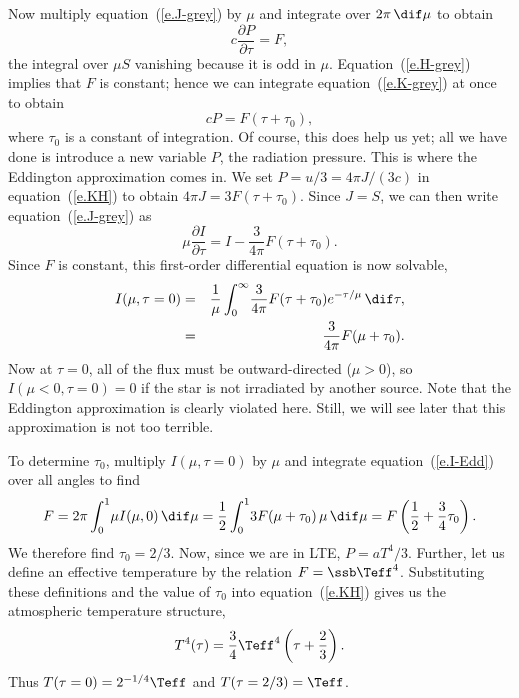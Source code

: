 Now multiply equation~(\ref{e.J-grey}) by $\mu$ and integrate over $2\pi\,\dif\mu$ to obtain
\begin{equation}\label{e.K-grey}
c\frac{\partial P}{\partial\tau} = F,
\end{equation}
the integral over $\mu S$ vanishing because it is odd in $\mu$. Equation~(\ref{e.H-grey}) implies that $F$ is constant; hence we can integrate equation~(\ref{e.K-grey}) at once to obtain
\begin{equation}\label{e.KH}
cP = F(\tau + \tau_{0}),
\end{equation}
where $\tau_{0}$ is a constant of integration. Of course, this does help us yet; all we have done is introduce a new variable $P$, the radiation pressure. This is where the Eddington approximation comes in.  We set $P = u/3 = 4\pi J/(3c)$ in equation~(\ref{e.KH}) to obtain $4\pi J = 3F(\tau + \tau_{0})$. Since $J = S$, we can then write equation~(\ref{e.J-grey}) as
\begin{equation}
\mu\frac{\partial I}{\partial\tau} = I - \frac{3}{4\pi}F(\tau+\tau_{0}).
\end{equation}
Since $F$ is constant, this first-order differential equation is now solvable,
\begin{eqnarray}
I(\mu,\tau=0) &=& \frac{1}{\mu}\int_{0}^{\infty}\!\frac{3}{4\pi}F(\tau + \tau_{0}) e^{-\tau/\mu}\,\dif\tau,\nonumber\\
  &=& \frac{3}{4\pi}F(\mu + \tau_{0}).\label{e.I-Edd}
\end{eqnarray}
Now at $\tau = 0$, all of the flux must be outward-directed ($\mu >0$), so $I(\mu < 0,\tau = 0) = 0$ if the star is not irradiated by another source.  Note that the Eddington approximation is clearly violated here.  Still, we will see later that this approximation is not too terrible. 

To determine $\tau_{0}$, multiply $I(\mu,\tau = 0)$ by $\mu$ and integrate equation~(\ref{e.I-Edd}) over all angles to find
\begin{equation}
F = 2\pi\int_{0}^{1}\!\mu I(\mu,0)\,\dif\mu = \frac{1}{2}\int_{0}^{1}\!3F(\mu + \tau_{0})\,\mu\,\dif\mu = F\left(\frac{1}{2} + \frac{3}{4}\tau_{0}\right).
\end{equation}
We therefore find $\tau_{0} = 2/3$. Now, since we are in LTE, $P = aT^{4}/3$. Further, let us define an effective temperature by the relation $F = \ssb\Teff^{4}$.  Substituting these definitions and the value of $\tau_{0}$ into equation~(\ref{e.KH}) gives us the atmospheric temperature structure,
\begin{equation}\label{e.Eddington}
T^{4}(\tau) = \frac{3}{4}\Teff^{4}\left(\tau + \frac{2}{3}\right).
\end{equation}
Thus $T(\tau  = 0) = 2^{-1/4} \Teff$ and $T(\tau = 2/3) = \Teff$.  

